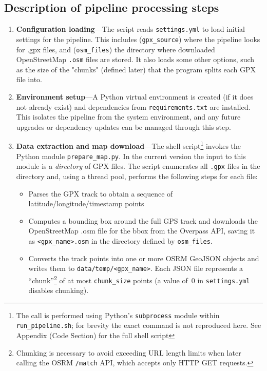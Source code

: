 \documentclass[11pt,a4paper]{article}
\begin{document}
\subsection{Description of pipeline processing steps}
\begin{enumerate}
	\item \textbf{Configuration loading}---The script reads \texttt{settings.yml} to load initial settings for the pipeline. This includes (\texttt{gpx\_source}) where the pipeline looks for .gpx files, and (\texttt{osm\_files}) the directory where downloaded OpenStreetMap \texttt{.osm} files are stored. It also loads some other options, such as the size of the "chunks" (defined later) that the program splits each GPX file into.
	\item \textbf{Environment setup}---A Python virtual environment is created (if it does not already exist) and dependencies from \texttt{requirements.txt} are installed.  This isolates the pipeline from the system environment, and any future upgrades or dependency updates can be managed through this step.
	\item \textbf{Data extraction and map download}---The shell script\footnote{The call is performed using Python's \texttt{subprocess} module within \texttt{run\_pipeline.sh}; for brevity the exact command is not reproduced here. See Appendix (Code Section) for the full shell script} invokes the Python module \texttt{prepare\_map.py}. In the current version the input to this module is a \emph{directory} of GPX files.  The script enumerates all \texttt{.gpx} files in the directory and, using a thread pool, performs the following steps for each file:
	      \begin{itemize}
		      \item Parses the GPX track to obtain a sequence of latitude/longitude/timestamp points
		      \item Computes a bounding box around the full GPS track and downloads the OpenStreetMap .osm file for the bbox from the Overpass API, saving it as \texttt{\textless gpx\_name\textgreater{}.osm} in the directory defined by \texttt{osm\_files}. \citep{overpass}
		      \item Converts the track points into one or more OSRM GeoJSON objects and writes them to \texttt{data/temp/\textless gpx\_name\textgreater{}}. Each JSON file represents a ``chunk''\footnote{Chunking is necessary to avoid exceeding URL length limits when later calling the OSRM \texttt{/match} API, which accepts only HTTP GET requests.} of at most \texttt{chunk\_size} points (a value of~0 in \texttt{settings.yml} disables chunking).

\end{itemize}
\end{enumerate}
\end{document}
